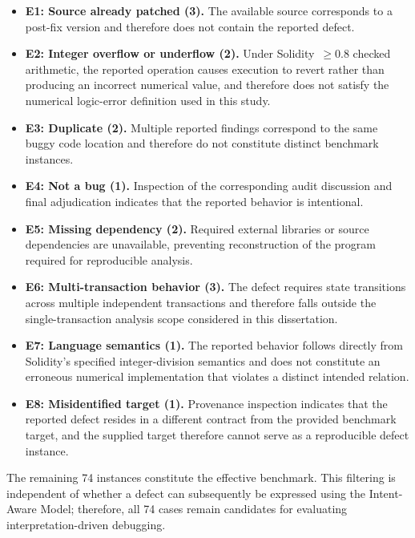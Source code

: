 \documentclass[11pt,oneside]{report}
\theoremstyle{plain}
\theoremstyle{definition}
\theoremstyle{remark}
\begin{document}
\begin{itemize}
    \item \textbf{E1: Source already patched (3).}
    The available source corresponds to a post-fix version and therefore does not contain the reported defect.

    \item \textbf{E2: Integer overflow or underflow (2).}
    Under Solidity~$\geq$0.8 checked arithmetic, the reported operation causes execution to revert rather than producing an incorrect numerical value, and therefore does not satisfy the numerical logic-error definition used in this study.

    \item \textbf{E3: Duplicate (2).}
    Multiple reported findings correspond to the same buggy code location and therefore do not constitute distinct benchmark instances.

    \item \textbf{E4: Not a bug (1).}
    Inspection of the corresponding audit discussion and final adjudication indicates that the reported behavior is intentional.

    \item \textbf{E5: Missing dependency (2).}
    Required external libraries or source dependencies are unavailable, preventing reconstruction of the program required for reproducible analysis.

    \item \textbf{E6: Multi-transaction behavior (3).}
    The defect requires state transitions across multiple independent transactions and therefore falls outside the single-transaction analysis scope considered in this dissertation.

    \item \textbf{E7: Language semantics (1).}
    The reported behavior follows directly from Solidity's specified integer-division semantics and does not constitute an erroneous numerical implementation that violates a distinct intended relation.

    \item \textbf{E8: Misidentified target (1).}
    Provenance inspection indicates that the reported defect resides in a different contract from the provided benchmark target, and the supplied target therefore cannot serve as a reproducible defect instance.
\end{itemize}

The remaining 74 instances constitute the effective benchmark.
This filtering is independent of whether a defect can subsequently be expressed using the Intent-Aware Model; therefore, all 74 cases remain candidates for evaluating interpretation-driven debugging.
\end{document}
